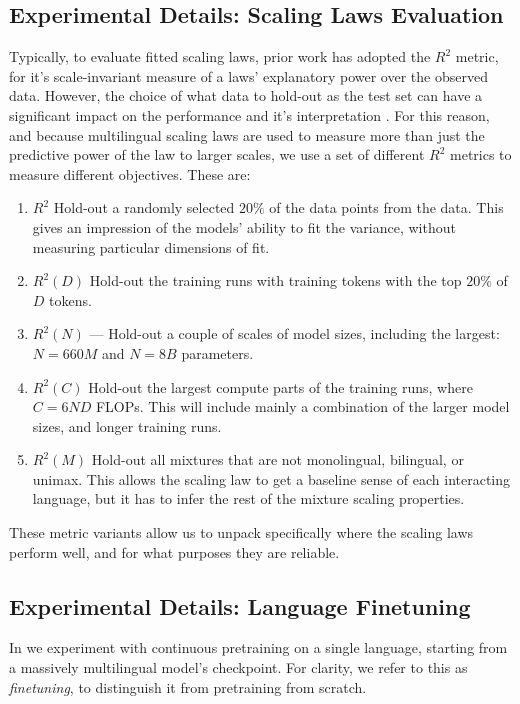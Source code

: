 \subsection{Experimental Details: Scaling Laws Evaluation}
\label{app:scaling-laws-evaluation}

Typically, to evaluate fitted scaling laws, prior work has adopted the $R^2$ metric, for it's scale-invariant measure of a laws' explanatory power over the observed data.
However, the choice of what data to hold-out as the test set can have a significant impact on the performance and it's interpretation \citep{li2025mis}.
For this reason, and because multilingual scaling laws are used to measure more than just the predictive power of the law to larger scales, we use a set of different $R^2$ metrics to measure different objectives.
These are:
\begin{enumerate}
    \item \textbf{$R^2$} Hold-out a randomly selected $20\%$ of the data points from the data. This gives an impression of the models' ability to fit the variance, without measuring particular dimensions of fit.
    \item \textbf{$R^2(D)$} Hold-out the training runs with training tokens with the top $20\%$ of $D$ tokens.
    \item \textbf{$R^2(N)$} --- Hold-out a couple of scales of model sizes, including the largest: $N=660M$ and $N=8B$ parameters.
    \item \textbf{$R^2(C)$} Hold-out the largest compute parts of the training runs, where $C=6ND$ FLOPs. This will include mainly a combination of the larger model sizes, and longer training runs.
    \item \textbf{$R^2(M)$} Hold-out all mixtures that are not monolingual, bilingual, or unimax. This allows the scaling law to get a baseline sense of each interacting language, but it has to infer the rest of the mixture scaling properties.
\end{enumerate}

These metric variants allow us to unpack specifically where the scaling laws perform well, and for what purposes they are reliable.


\subsection{Experimental Details: Language Finetuning}
\label{app:language-finetune-details}

In  we experiment with continuous pretraining on a single language, starting from a massively multilingual model's checkpoint.
For clarity, we refer to this as \emph{finetuning}, to distinguish it from pretraining from scratch.

